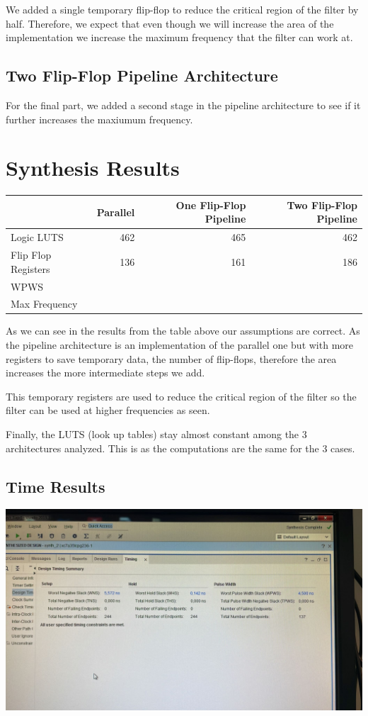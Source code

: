 \documentclass[a4paper, 12pt]{article}
\begin{document}
We added a single temporary flip-flop to reduce the critical region of the filter by half. Therefore, we expect that even though we will increase the area of the implementation we increase the maximum frequency that the filter can work at.
\subsection{Two Flip-Flop Pipeline Architecture}
\label{sec:org9993638}

For the final part, we added a second stage in the pipeline architecture to see if it further increases the maxiumum frequency.
\section{Synthesis Results}
\label{sec:org0176c3a}

\begin{center}
\begin{tabular}{lrrr}
 & Parallel & One Flip-Flop Pipeline & Two Flip-Flop Pipeline\\
\hline
Logic LUTS & 462 & 465 & 462\\
Flip Flop Registers & 136 & 161 & 186\\
WPWS &  &  & \\
Max Frequency &  &  & \\
\end{tabular}
\end{center}

As we can see in the results from the table above our assumptions are correct. As the pipeline architecture is an implementation of the parallel one but with more registers to save temporary data, the number of flip-flops, therefore the area increases the more intermediate steps we add.

This temporary registers are used to reduce the critical region of the filter so the filter can be used at higher frequencies as seen.

Finally, the LUTS (look up tables) stay almost constant among the 3 architectures analyzed. This is as the computations are the same for the 3 cases.
\subsection{Time Results}
\label{sec:org35c83f2}
\begin{center}
\includegraphics[width=.9\linewidth]{./img/time_report_parallel.jpg}
\end{center}
\end{document}
